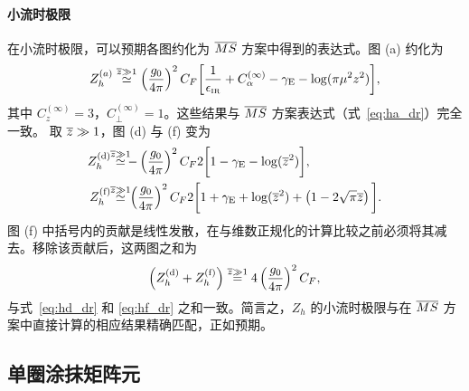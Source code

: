 \paragraph{小流时极限}在小流时极限，可以预期各图约化为 $\overline{MS}$ 方案中得到的表达式。图 (a) 约化为
\begin{equation}
Z_h^{(a)}  \stackrel{\overline{z} \gg 1}{\simeq}\left(\frac{g_0}{4\pi}\right)^2C_F \bigg[\frac{1}{\epsilon_{\scriptscriptstyle\mathrm{IR}}} + C^{(\infty)}_\alpha-\gamma_{\mathrm{E}}-\log(\pi\mu^2z^2) \bigg],
\end{equation}
其中 $C^{(\infty)}_z = 3$，$C^{(\infty)}_\perp = 1$。这些结果与 $\overline{MS}$ 方案表达式（式~\ref{eq:ha_dr}）完全一致。
取 $\overline{z} \gg 1$，图 (d) 与 (f) 变为
\begin{align}
Z_h^\mathrm{(d)}\!\! \stackrel{\oz \gg 1}{\simeq} {} & \!\!\!{-}\left(\frac{g_0}{4\pi}\right)^2C_F 2\bigg[1-\gE-\log(\oz^2) \bigg],\\
Z_h^\mathrm{(f)}\!\! \stackrel{\oz \gg 1}{\simeq} {} & \!\!\!\left(\frac{g_0}{4\pi}\right)^2C_F 2\bigg[1+\gE+\log(\oz^2)  +\left(1-2\sqrt{\pi}\oz\right) \bigg].
\end{align}
图 (f) 中括号内的贡献是线性发散，在与维数正规化的计算比较之前必须将其减去。移除该贡献后，这两图之和为
\begin{equation}
\left(Z_h^\mathrm{(d)} +Z_h^\mathrm{(f)}\right)\stackrel{\overline{z} \gg 1}{=} 4\left(\frac{g_0}{4\pi}\right)^2C_F,\label{eq:hoztoinfty}
\end{equation}
与式~\eqref{eq:hd_dr} 和 \eqref{eq:hf_dr} 之和一致。简言之，$Z_h$ 的小流时极限与在 $\overline{MS}$ 方案中直接计算的相应结果精确匹配，正如预期。


\subsection{单圈涂抹矩阵元}

